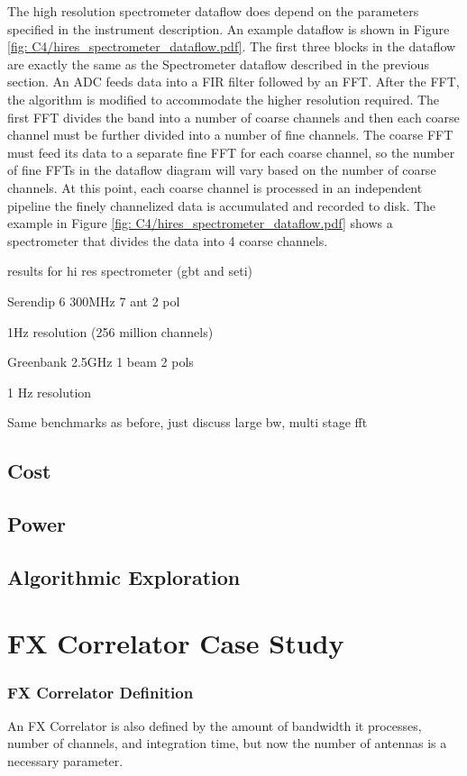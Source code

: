 The high resolution spectrometer dataflow does depend on the parameters specified in the instrument description. 
An example dataflow is shown in Figure \ref{fig: C4/hires_spectrometer_dataflow.pdf}. 
The first three blocks in the dataflow are exactly the same as the Spectrometer dataflow described in the previous section. 
An ADC feeds data into a FIR filter followed by an FFT. 
After the FFT, the algorithm is modified to accommodate the higher resolution required. 
The first FFT divides the band into a number of coarse channels and then each coarse channel must be further divided into a number of fine channels. 
The coarse FFT must feed its data to a separate fine FFT for each coarse channel, so the number of fine FFTs in the dataflow diagram will vary based on the number of coarse channels.
At this point, each coarse channel is processed in an independent pipeline the finely channelized data is accumulated and recorded to disk. 
The example in Figure \ref{fig: C4/hires_spectrometer_dataflow.pdf} shows a spectrometer that divides the data into 4 coarse channels.

results for hi res spectrometer (gbt and seti)

Serendip 6 300MHz 7 ant 2 pol

1Hz resolution (256 million channels)

Greenbank 2.5GHz 1 beam 2 pols

1 Hz resolution

Same benchmarks as before, just discuss large bw, multi stage fft
\subsection{Cost}
\subsection{Power}
\subsection{Algorithmic Exploration}

\section{FX Correlator Case Study}
\subsubsection{FX Correlator Definition}
An FX Correlator is also defined by the amount of bandwidth it processes, number of channels, and integration time, but now the number of antennas is a necessary parameter.

